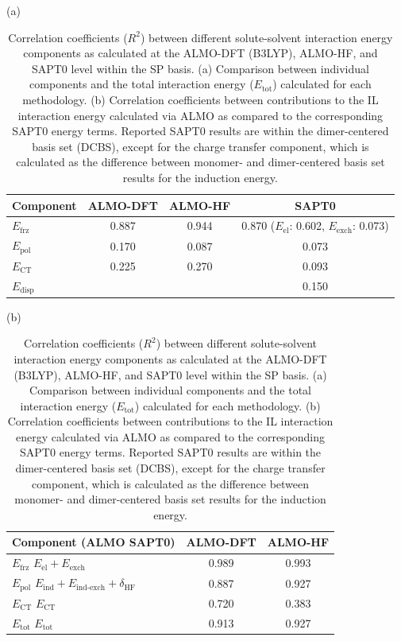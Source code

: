 \documentclass[%
  class = book,%
  crop = false,%
  float = true,%
  multi = true,%
  preview = false,%
]{standalone}
\newcommand{\cotil}{\ce{CO2}\textendash{}IL\xspace}%
\begin{document}
\begin{table}
  \centering
  \caption[Correlation between ALMO and SAPT terms]{Correlation coefficients (\(R^2\)) between different solute-solvent interaction energy components as calculated at the ALMO-DFT (B3LYP), ALMO-HF, and SAPT0 level within the SP basis. (a) Comparison between individual components and the total interaction energy (\(E_{\text{tot}}\)) calculated for each methodology. (b) Correlation coefficients between contributions to the \cotil interaction energy calculated via ALMO as compared to the corresponding SAPT0 energy terms. Reported SAPT0 results are within the dimer-centered basis set (DCBS), except for the charge transfer component, which is calculated as the difference between monomer- and dimer-centered basis set results for the induction energy.}
  \label{paper_02:tab:7}

  (a)

  \begin{tabular}{lccc}
    \toprule
    Component & ALMO-DFT & ALMO-HF & SAPT0 \\
    \midrule
    \(E_{\text{frz}}\) & 0.887 & 0.944 & \makecell{0.870 \\ (\(E_{\text{el}}\): 0.602, \(E_{\text{exch}}\): 0.073)} \\
    \(E_{\text{pol}}\) & 0.170 & 0.087 & 0.073 \\
    \(E_{\text{CT}}\) & 0.225 & 0.270 & 0.093 \\
    \(E_{\text{disp}}\) & \textemdash{} & \textemdash{} & 0.150 \\
    \bottomrule
  \end{tabular}

  (b)

  \begin{tabular}{lcc}
    \toprule
    Component (ALMO \textemdash{} SAPT0) & ALMO-DFT & ALMO-HF \\
    \midrule
    \(E_{\text{frz}}\) \textemdash{} \(E_{\text{el}} + E_{\text{exch}}\) & 0.989 & 0.993 \\
    \(E_{\text{pol}}\) \textemdash{} \(E_{\text{ind}} + E_{\text{ind-exch}} + \delta_{\text{HF}}\) & 0.887 & 0.927 \\
    \(E_{\text{CT}}\) \textemdash{} \(E_{\text{CT}}\) & 0.720 & 0.383 \\
    \(E_{\text{tot}}\) \textemdash{} \(E_{\text{tot}}\) & 0.913 & 0.927 \\
    \bottomrule
  \end{tabular}
\end{table}
\end{document}
